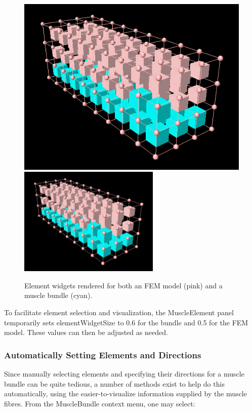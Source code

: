 \documentclass{article}
\begin{document}
\begin{figure}
\begin{center}
\iflatexml
\includegraphics[]{images/elementWidgets}
\else
\includegraphics[width=0.60\textwidth]{images/elementWidgets}
\fi
\end{center}
\caption{Element widgets rendered for both an FEM model (pink) 
and a muscle bundle (cyan).}%
\label{elementWidgetsFig}
\end{figure}

To facilitate element selection and visualization,
the MuscleElement panel
temporarily sets {\sf elementWidgetSize} to 0.6 for the bundle and 0.5 for
the FEM model. These values can then be adjusted as needed.

\subsubsection{Automatically Setting Elements and Directions}

Since manually selecting elements and specifying their directions for
a muscle bundle can be quite tedious, a number of methods exist to
help do this automatically, using the easier-to-visualize information
supplied by the muscle fibres. From the MuscleBundle context menu, one
may select:
\end{document}
